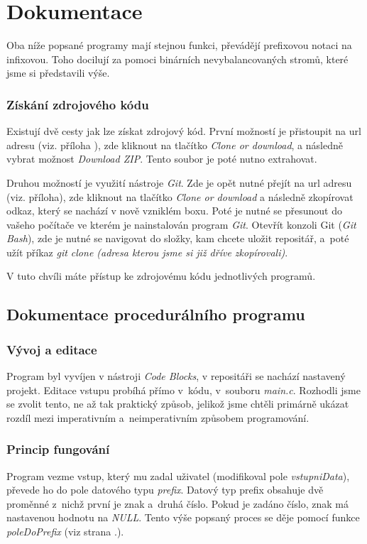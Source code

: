 \documentclass[12pt,a4paper]{report}
\begin{document}
\chapter{Dokumentace}
Oba níže popsané programy mají stejnou funkci, převádějí prefixovou notaci na infixovou. Toho docilují za pomoci binárních nevybalancovaných stromů, které jsme si představili výše.
\subsection*{Získání zdrojového kódu}
Existují dvě cesty jak lze získat zdrojový kód. První možností je přistoupit na url adresu (viz. příloha ), zde kliknout na tlačítko \textit{Clone or download}, a následně vybrat možnost \textit{Download ZIP}. Tento soubor je poté nutno extrahovat. 

Druhou možností je využití nástroje \textit{Git}. Zde je opět nutné přejít na url adresu (viz. příloha), zde kliknout na tlačítko \textit{Clone or download} a následně zkopírovat odkaz, který se nachází v nově vzniklém boxu. Poté je nutné se přesunout do vašeho počítače ve kterém je nainstalován program \textit{Git}. Otevřít konzoli Git (\textit{Git Bash}), zde je nutné se navigovat do složky, kam chcete uložit repositář, a~poté užít příkaz \textit{git clone (adresa kterou jsme si již dříve zkopírovali)}.

V tuto chvíli máte přístup ke zdrojovému kódu jednotlivých programů.   
\section{Dokumentace procedurálního programu}
\subsection{Vývoj a editace}
Program byl vyvíjen v nástroji \textit{Code Blocks}, v repositáři se nachází nastavený projekt. Editace vstupu probíhá přímo v~kódu, v~souboru \textit{main.c}. Rozhodli jsme se zvolit tento, ne až tak praktický způsob, jelikož jsme chtěli primárně ukázat rozdíl mezi imperativním a~neimperativním způsobem programování. 
\subsection{Princip fungování}
Program vezme vstup, který mu zadal uživatel (modifikoval pole \textit{vstupniData}), převede ho do pole datového typu \textit{prefix}. Datový typ prefix obsahuje dvě proměnné z~nichž první je znak a~druhá číslo. Pokud je zadáno číslo, znak má nastavenou hodnotu na \textit{NULL}. Tento výše popsaný proces se děje pomocí funkce \textit{poleDoPrefix} (viz strana \pageref{pDP}.).
\end{document}
